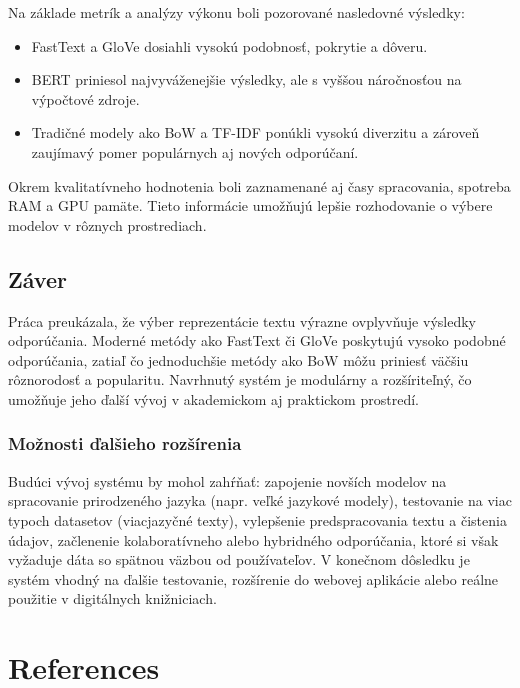 \documentclass[\myFontSize,a4paper,oneside,hidelinks]{article}
\begin{document}
Na základe metrík a analýzy výkonu boli pozorované nasledovné výsledky:
\begin{itemize}
\item    FastText a GloVe dosiahli vysokú podobnosť, pokrytie a dôveru.
\item    BERT priniesol najvyváženejšie výsledky, ale s vyššou náročnosťou na výpočtové zdroje.
\item    Tradičné modely ako BoW a TF-IDF ponúkli vysokú diverzitu a zároveň zaujímavý pomer populárnych aj nových odporúčaní.
\end{itemize}
Okrem kvalitatívneho hodnotenia boli zaznamenané aj časy spracovania, spotreba RAM a GPU pamäte. Tieto informácie umožňujú lepšie rozhodovanie o výbere modelov v rôznych prostrediach.

\subsection*{Záver}
Práca preukázala, že výber reprezentácie textu výrazne ovplyvňuje výsledky odporúčania. Moderné metódy ako FastText či GloVe poskytujú vysoko podobné odporúčania, zatiaľ čo jednoduchšie metódy ako BoW môžu priniesť väčšiu rôznorodosť a popularitu. Navrhnutý systém je modulárny a rozšíriteľný, čo umožňuje jeho ďalší vývoj v akademickom aj praktickom prostredí.

\subsubsection*{Možnosti ďalšieho rozšírenia}
Budúci vývoj systému by mohol zahŕňať:
zapojenie novších modelov na spracovanie prirodzeného jazyka (napr. veľké jazykové modely),
testovanie na viac typoch datasetov (viacjazyčné texty),
vylepšenie predspracovania textu a čistenia údajov,
začlenenie kolaboratívneho alebo hybridného odporúčania, ktoré si však vyžaduje dáta so spätnou väzbou od používateľov.
V konečnom dôsledku je systém vhodný na ďalšie testovanie, rozšírenie do webovej aplikácie alebo reálne použitie v digitálnych knižniciach.


\clearpage 
\section*{References} %
\renewcommand{\refname}{}

\normalsize 
 
 
\nocite{*}
\end{document}
